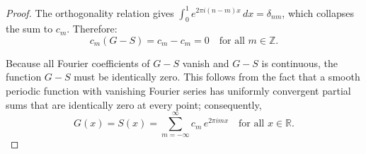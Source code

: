 \begin{proof}
The orthogonality relation gives $\int_0^1 e^{2\pi i (n-m) x} \, dx = \delta_{nm}$, which collapses the sum to $c_m$. Therefore:
$$c_m(G - S) = c_m - c_m = 0 \quad \text{for all } m \in \mathbb{Z}.$$

Because all Fourier coefficients of $G-S$ vanish and $G-S$ is continuous, the function $G-S$ must be identically zero. This follows from the fact that a smooth periodic function with vanishing Fourier series has uniformly convergent partial sums that are identically zero at every point; consequently,
$$G(x) = S(x) = \sum_{m=-\infty}^{\infty} c_m \, e^{2\pi i m x} \quad \text{for all } x \in \mathbb{R}.$$
\end{proof}
